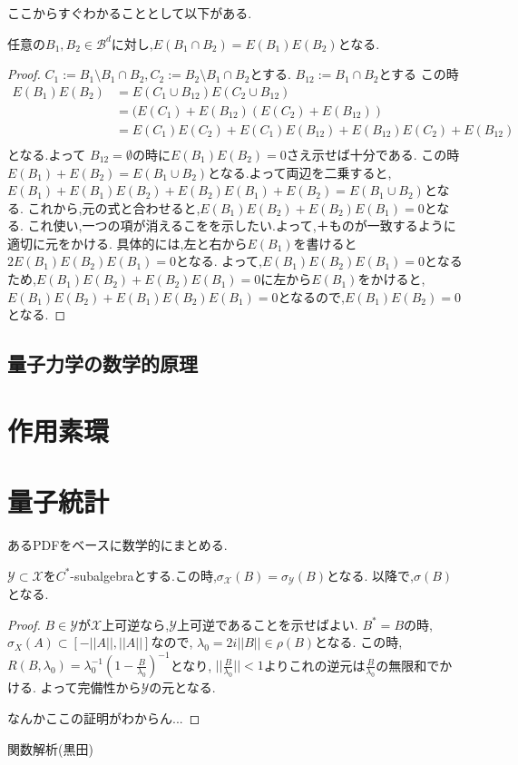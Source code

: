\documentclass[uplatex]{jsbook}
\begin{document}
ここからすぐわかることとして以下がある.
\begin{lem}
  任意の$B_1,B_2 \in \mathcal{B}^{d}$に対し,$E(B_1 \cap B_2) = E(B_1)E(B_2)$となる.
\end{lem}
\begin{proof}
  $C_1:= B_1 \setminus B_1 \cap B_2, C_2 := B_2 \setminus B_1 \cap B_2$とする.
  $B_{12}:= B_1 \cap B_2$とする
  この時
  \begin{align*}
   E(B_1)E(B_2)& = E(C_1 \cup B_{12})E(C_2 \cup B_{12}) \\
                           & = (E(C_1) +E(B_{12})(E(C_2) + E(B_{12})) \\
                           & = E(C_1)E(C_2) + E(C_1)E(B_{12}) + E(B_{12})E(C_2) + E(B_{12})\\
\end{align*}
となる.よって $B_{12} = \emptyset$の時に$E(B_1)E(B_2) = 0$さえ示せば十分である.
この時$E(B_1) +E(B_2) = E(B_1 \cup B_2)$となる.よって両辺を二乗すると,
$E(B_1) + E(B_1)E(B_2) + E(B_2)E(B_1) + E(B_2) = E(B_1 \cup B_2)$となる.
これから,元の式と合わせると,$E(B_1)E(B_2) + E(B_2)E(B_1) = 0$となる.
これ使い,一つの項が消えるこをを示したい.よって,＋ものが一致するように適切に元をかける.
具体的には,左と右から$E(B_1)$を書けると$2 E(B_1)E(B_2)E(B_1) = 0$となる.
よって,$E(B_1)E(B_2)E(B_1) = 0$となるため,$E(B_1)E(B_2) + E(B_2)E(B_1) = 0$に左から$E(B_1)$をかけると,
$E(B_1)E(B_2) +E(B_1)E(B_2)E(B_1) = 0$となるので,$E(B_1)E(B_2) = 0$となる.
\end{proof}


\chapter{量子力学の数学的原理}


\part{作用素環}

\part{量子統計}
あるPDFをベースに数学的にまとめる.

\begin{thm}
$\mathcal{Y} \subset \mathcal{X}$を$C^*$-subalgebraとする.この時,$\sigma_{\mathcal{X}}(B) = \sigma_{\mathcal{Y}}(B)$となる.
以降で,$\sigma(B)$となる.
\end{thm}
\begin{proof}
$B \in \mathcal{Y}$が$\mathcal{X}$上可逆なら,$\mathcal{Y}$上可逆であることを示せばよい.
$B^*=B$の時,$\sigma_X(A) \subset [-||A||, ||A||]$なので,
$\lambda_0 = 2i||B|| \in \rho(B)$となる.
この時,$R(B, \lambda_0) = \lambda_0^{-1}(1 - \frac{B}{\lambda_0})^{-1}$となり,
$||\frac{B}{\lambda_0}|| < 1$よりこれの逆元は$\frac{B}{\lambda_0}$の無限和でかける.
よって完備性から$\mathcal{Y}$の元となる.

なんかここの証明がわからん...
\end{proof}

\begin{thebibliography}{99}
  関数解析(黒田)
\end{thebibliography}
\end{document}
